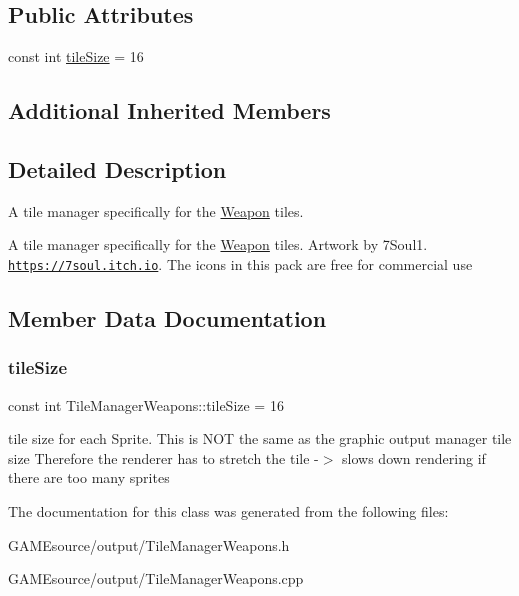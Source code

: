 \subsection*{Public Attributes}
\begin{DoxyCompactItemize}
\item 
const int \mbox{\hyperlink{class_tile_manager_weapons_ad8a290753e453499f6b10535a58c39b7}{tile\+Size}} = 16
\end{DoxyCompactItemize}
\subsection*{Additional Inherited Members}


\subsection{Detailed Description}
A tile manager specifically for the \mbox{\hyperlink{class_weapon}{Weapon}} tiles. 

A tile manager specifically for the \mbox{\hyperlink{class_weapon}{Weapon}} tiles. Artwork by 7\+Soul1. \href{https://7soul.itch.io}{\tt https\+://7soul.\+itch.\+io}. The icons in this pack are free for commercial use 

\subsection{Member Data Documentation}
\mbox{\label{class_tile_manager_weapons_ad8a290753e453499f6b10535a58c39b7}} 
\subsubsection{\texorpdfstring{tile\+Size}{tileSize}}
{\footnotesize\ttfamily const int Tile\+Manager\+Weapons\+::tile\+Size = 16}

tile size for each Sprite. This is N\+OT the same as the graphic output manager tile size Therefore the renderer has to stretch the tile -\/$>$ slows down rendering if there are too many sprites 

The documentation for this class was generated from the following files\+:\begin{DoxyCompactItemize}
\item 
G\+A\+M\+Esource/output/Tile\+Manager\+Weapons.\+h\item 
G\+A\+M\+Esource/output/Tile\+Manager\+Weapons.\+cpp\end{DoxyCompactItemize}
